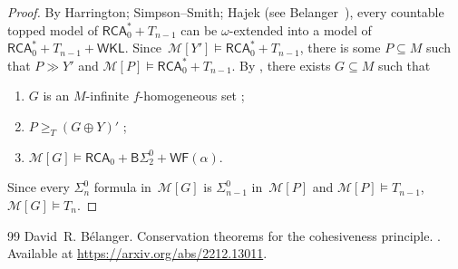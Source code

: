 \documentclass{article}
\numberwithin{theorem}{section}
\newtheorem{corollary}[theorem]{Corollary}
\newcommand{\RCA}{\mathsf{RCA}}
\newcommand{\WKL}{\mathsf{WKL}}
\newcommand{\BSig}{\mathsf{B}\Sigma^0}
\newcommand{\ISig}{\mathsf{I}\Sigma^0}
\newcommand{\WF}{\mathsf{WF}}
\newcommand{\M}{\mathcal{M}}
\begin{document}

\begin{proof}
By Harrington; Simpson–Smith; Hajek (see Belanger~\cite{Blanger2022ConservationTF}), every countable topped model of $\RCA_0^* + T_{n-1}$ can be $\omega$-extended into a model of~$\RCA_0^* + T_{n-1} + \WKL$. Since~$\M[Y'] \models \RCA_0^* + T_{n-1}$, there is some $P \subseteq M$ such that $P \gg Y'$ and $\M[P] \models \RCA_0^* + T_{n-1}$. By , there exists $G \subseteq M$ such that 
\begin{enumerate}
    \item $G$ is an $M$-infinite $f$-homogeneous set ;
    \item $P \geq_T (G \oplus Y)'$ ;
    \item $\M[G] \models \RCA_0 + \BSig_2 + \WF(\alpha)$.
\end{enumerate}
Since every $\Sigma^0_n$ formula in~$\M[G]$ is $\Sigma^0_{n-1}$ in~$\M[P]$
and $\M[P] \models T_{n-1}$, $\M[G] \models T_n$.
\end{proof}

\begin{thebibliography}{99}
David~R. B{\'e}langer.
\newblock Conservation theorems for the cohesiveness principle.
.
\newblock Available at \url{https://arxiv.org/abs/2212.13011}.
\end{thebibliography}
\end{document}
